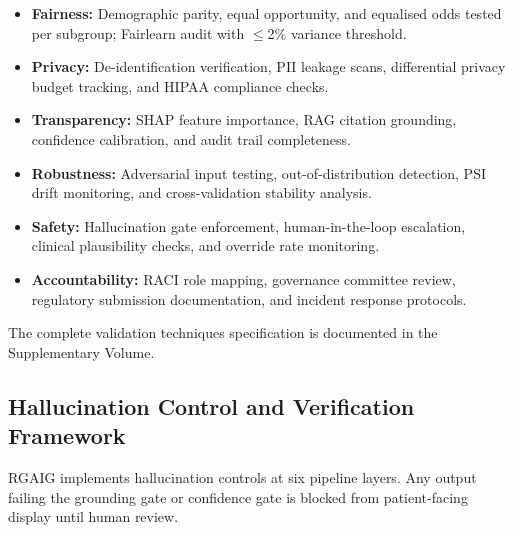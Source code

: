 \begin{itemize}[leftmargin=*, itemsep=3pt]
    \item \textbf{Fairness:} Demographic parity, equal opportunity, and equalised odds tested per subgroup; Fairlearn audit with $\leq$2\% variance threshold.
    \item \textbf{Privacy:} De-identification verification, PII leakage scans, differential privacy budget tracking, and HIPAA compliance checks.
    \item \textbf{Transparency:} SHAP feature importance, RAG citation grounding, confidence calibration, and audit trail completeness.
    \item \textbf{Robustness:} Adversarial input testing, out-of-distribution detection, PSI drift monitoring, and cross-validation stability analysis.
    \item \textbf{Safety:} Hallucination gate enforcement, human-in-the-loop escalation, clinical plausibility checks, and override rate monitoring.
    \item \textbf{Accountability:} RACI role mapping, governance committee review, regulatory submission documentation, and incident response protocols.
\end{itemize}

\noindent The complete validation techniques specification is documented in the Supplementary Volume.


\subsection{Hallucination Control and Verification Framework}
\label{sec:hallucination_control}


RGAIG implements hallucination controls at six pipeline layers. Any output failing the grounding gate or confidence gate is blocked from patient-facing display until human review.


